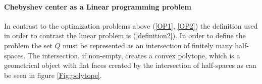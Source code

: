 \documentclass[]{article}
\newcommand{\Q}[0]{\textit{Q}}
\begin{document}
\paragraph{Chebyshev center as a Linear programming problem \\}
In contrast to the optimization problems above (\ref{OP1}, \ref{OP2}) the definition used in order to contrast the linear problem is (\ref{definition2}). In order to define the problem the set $\Q$ must be represented as an intersection of finitely many half-spaces. The intersection, if non-empty, creates a convex polytope, which is a geometrical object with flat faces created by the intersection of half-spaces as can be seen in figure \ref{Fig:polytope}.

\begin{figure}[!h]
	

\end{figure}
\end{document}
